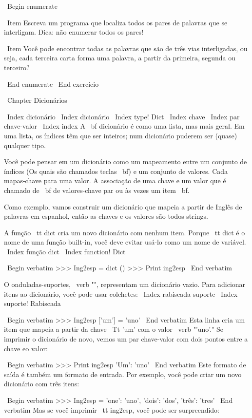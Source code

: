 \documentclass[10pt]{book}
\begin{document}
\begin {itemize}
{{{{{{{\ Begin {enumerate}

\ Item Escreva um programa que localiza todos os pares de palavras que se interligam.
  Dica: não enumerar todos os pares!

\ Item Você pode encontrar todas as palavras que são de três vias interligadas, ou seja,
  cada terceira carta forma uma palavra, a partir da primeira, segunda ou
  terceiro?

\ End {enumerate}
\ End {} exercício


\ Chapter {} Dicionários

\ Index {} dicionário
\ Index {} dicionário
\ Index {type! Dict}
\ Index {chave}
\ Index {par chave-valor}
\ Index {index}
A {\ bf dicionário} é como uma lista, mas mais geral. Em uma lista,
os índices têm que ser inteiros; num dicionário puderem
ser (quase) qualquer tipo.

Você pode pensar em um dicionário como um mapeamento entre um conjunto de índices
(Os quais são chamados teclas {\ bf}) e um conjunto de valores. Cada mapas-chave para uma
valor. A associação de uma chave e um valor que é chamado de {\ bf
  de valores-chave par} ou {às vezes um item \ bf}.

Como exemplo, vamos construir um dicionário que mapeia a partir de Inglês
de palavras em espanhol, então as chaves e os valores são todos strings.

A função {\ tt dict} cria um novo dicionário com nenhum item.
Porque {\ tt dict} é o nome de uma função built-in, você
deve evitar usá-lo como um nome de variável.
\ Index {função dict}
\ Index {function! Dict}

\ Begin {verbatim}
>>> Ing2esp = dict ()
>>> Print ing2esp
{}
\ End {verbatim}

O onduladas-suportes, \ verb "{}", representam um dicionário vazio.
Para adicionar itens ao dicionário, você pode usar colchetes:
\ Index {rabiscada suporte}
\ Index {suporte! Rabiscada}

\ Begin {verbatim}
>>> Ing2esp ['um'] = 'uno'
\ End {verbatim}
%
Esta linha cria um item que mapeia a partir da chave
{\ Tt 'um'} com o valor \ verb "'uno'." Se imprimir o
dicionário de novo, vemos um par chave-valor com dois pontos
entre a chave eo valor:

\ Begin {verbatim}
>>> Print ing2esp
{'Um': 'uno'}
\ End {verbatim}
%
Este formato de saída é também um formato de entrada. Por exemplo,
você pode criar um novo dicionário com três itens:

\ Begin {verbatim}
>>> Ing2esp = {'one': 'uno', 'dois': 'dos', 'três': 'tres'}
\ End {verbatim}
%
Mas se você imprimir {\ tt ing2esp}, você pode ser surpreendido:

}}}}}}}
\end{itemize}
\end{document}
